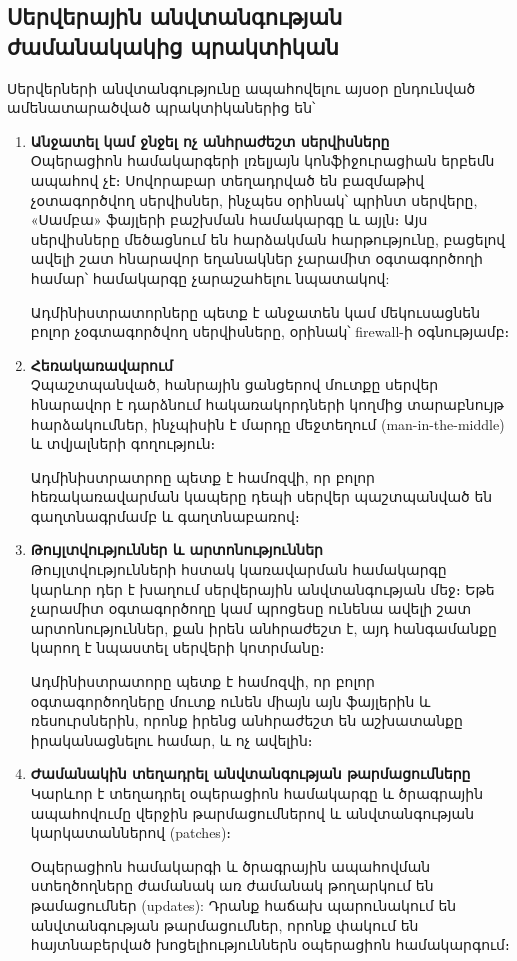 \documentclass[a4paper,12pt]{article}
\begin{document}
\begin{sloppypar}
\subsection{Սերվերային անվտանգության ժամանակակից պրակտիկան}


Սերվերների անվտանգությունը ապահովելու այսօր ընդունված ամենատարածված
պրակտիկաներից են՝

\begin{enumerate}
\item \textbf{Անջատել կամ ջնջել ոչ անհրաժեշտ սերվիսները}\\
    Օպերացիոն համակարգերի լռելյայն կոնֆիջուրացիան երբեմն ապահով չէ։
    Սովորաբար տեղադրված են բազմաթիվ չօտագործվող սերվիսներ, ինչպես
    օրինակ՝ պրինտ սերվերը, «Սամբա» ֆայլերի բաշխման համակարգը և այլն։
	Այս սերվիսները
    մեծացնում են հարձակման հարթությունը, բացելով ավելի շատ հնարավոր եղանակներ
    չարամիտ օգտագործողի համար՝ համակարգը չարաշահելու նպատակով:

    Ադմինիստրատորները պետք է անջատեն կամ մեկուսացնեն բոլոր չօգտագործվող
    սերվիսները, օրինակ՝ firewall-ի օգնությամբ։
\item \textbf{Հեռակառավարում}\\
    Չպաշտպանված, հանրային ցանցերով մուտքը սերվեր հնարավոր է դարձնում
    հակառակորդների կողմից տարաբնույթ հարձակումներ, ինչպիսին է
    մարդը մեջտեղում (man-in-the-middle) և տվյալների գողություն։

    Ադմինիստրատրոը պետք է համոզվի, որ բոլոր հեռակառավարման կապերը
    դեպի սերվեր պաշտպանված են գաղտնագրմամբ և գաղտնաբառով։
\item \textbf{Թույլտվություններ և արտոնություններ}\\
    Թույլտվությունների հստակ կառավարման համակարգը կարևոր դեր է խաղում
    սերվերային անվտանգության մեջ։ Եթե չարամիտ օգտագործողը կամ պրոցեսը
    ունենա ավելի շատ արտոնություններ, քան իրեն անհրաժեշտ է, այդ հանգամանքը
    կարող է նպաստել սերվերի կոտրմանը։

    Ադմինիստրատորը պետք է համոզվի, որ բոլոր օգտագործողները մուտք ունեն
    միայն այն ֆայլերին և ռեսուրսներին, որոնք իրենց անհրաժեշտ են
    աշխատանքը իրականացնելու համար, և ոչ ավելին։
\item \textbf{Ժամանակին տեղադրել անվտանգության թարմացումները}\\
    Կարևոր է տեղադրել օպերացիոն համակարգը և ծրագրային ապահովումը
    վերջին թարմացումներով և անվտանգության կարկատաններով (patches)։

	Օպերացիոն համակարգի և ծրագրային ապահովման ստեղծողները ժամանակ
	առ ժամանակ թողարկում են թամացումներ (updates):
	Դրանք հաճախ պարունակում են անվտանգության թարմացումներ, որոնք
	փակում են հայտնաբերված խոցելիություններն օպերացիոն համակարգում։


\end{enumerate}
\end{sloppypar}
\end{document}
